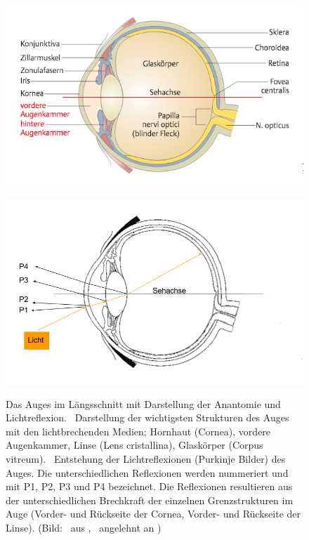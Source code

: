 \begin{figure}[ht]
   \begin{minipage}[b]{.5\linewidth}          \includegraphics[width=1.05\textwidth]{bilder/grundlagen/g3.png}
      \label{fig:querschnitt} 
   \end{minipage}%
   \hfill
   \begin{minipage}[b]{.5\linewidth} 
 \includegraphics[width=1.05\textwidth]{bilder/grundlagen/g1.png} 
      \label{fig:purk}
   \end{minipage}%
   \caption{Das Auges im Längsschnitt mit Darstellung der Anantomie und Lichtreflexion. \textbf{}~Darstellung der wichtigsten Strukturen des Auges mit den lichtbrechenden Medien; Hornhaut (Cornea), vordere Augenkammer, Linse (Lens cristallina), Glaskörper (Corpus vitreum). \textbf{}~Entstehung der Lichtreflexionen (Purkinje Bilder) des Auges. Die unterschiedlichen Reflexionen werden nummeriert und mit P1, P2, P3 und P4 bezeichnet. Die Reflexionen resultieren aus der unterschiedlichen Brechkraft der einzelnen Grenzstrukturen im Auge (Vorder- und Rückseite der Cornea, Vorder- und Rückseite der Linse).
(Bild: \textbf{}~aus \cite[S.438]{Krahn2011},  \textbf{}~angelehnt an \cite{Krahn2011})}\label{fig:anaauge} 
\end{figure} 

